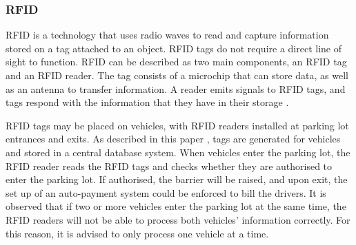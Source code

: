 \subsubsection*{\ac{RFID}}
\ac{RFID} is a technology that uses radio waves to read and capture information stored on a tag attached to an object. \ac{RFID} tags do not require a direct line of sight to function. \ac{RFID} can be described as two main components, an \ac{RFID} tag and an \ac{RFID} reader. The tag consists of a microchip that can store data, as well as an antenna to transfer information. A reader emits signals to \ac{RFID} tags, and tags respond with the information that they have in their storage \citep{RfidWww.epc-rfid.info}.

\ac{RFID} tags may be placed on vehicles, with \ac{RFID} readers installed at parking lot entrances and exits. As described in this paper \citep{pala_smart_2007}, tags are generated for vehicles and stored in a central database system. When vehicles enter the parking lot, the \ac{RFID} reader reads the \ac{RFID} tags and checks whether they are authorised to enter the parking lot. If authorised, the barrier will be raised, and upon exit, the set up of an auto-payment system could be enforced to bill the drivers. It is observed that if two or more vehicles enter the parking lot at the same time, the \ac{RFID} readers will not be able to process both vehicles' information correctly. For this reason, it is advised to only process one vehicle at a time.